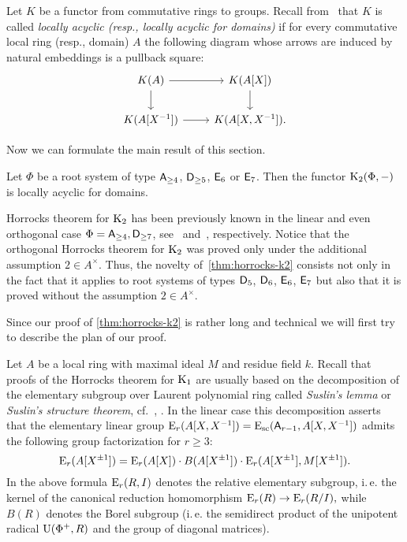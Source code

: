 \begin{dfn}
    Let $K$ be a functor from commutative rings to groups.
    Recall from~\cite{LSV2} that $K$ is called \textit{locally acyclic (resp., locally acyclic for domains)} if for every commutative local ring (resp., domain)
     $A$ the following diagram whose arrows are induced by natural embeddings is a pullback square:
    \begin{equation}\label{eq:P1-square} \begin{tikzcd} K(A) \ar[r] \ar[d] & K(A[X]) \arrow{d} \\ K(A[X\inv]) \ar{r} & K(A[X, X\inv]). \end{tikzcd} \end{equation}
\end{dfn}

Now we can formulate the main result of this section.
\begin{thm}\label{thm:horrocks-k2}
Let $\Phi$ be a root system of type $\mathsf{A}_{\geq 4}$, $\mathsf{D}_{\geq 5}$, $\mathsf{E}_6$ or $\mathsf{E}_7$.
Then the functor $\operatorname{K}_{2}(\Phi, -)$ is locally acyclic for domains.
\end{thm}
Horrocks theorem for $\operatorname{K}_2$ has been previously known in the linear and even orthogonal case $\Phi=\mathsf{A}_{\geq 4},\mathsf{D}_{\geq 7}$, see~\cite[Proposition~4.3]{Tu83} and~\cite[Theorem~1]{LS20}, respectively.
Notice that the orthogonal Horrocks theorem for $\operatorname{K}_2$ \cite[Theorem~1]{LS20} was proved only under the additional assumption $2 \in A^\times$.
Thus, the novelty of~\cref{thm:horrocks-k2} consists not only in the fact that it applies to root systems of types $\mathsf{D}_5$, $\mathsf{D}_6$, $\mathsf{E}_6$, $\mathsf{E}_7$ but also that
 it is proved without the assumption $2 \in A^\times$.

Since our proof of \cref{thm:horrocks-k2} is rather long and technical we will first try to describe the plan of our proof.

Let $A$ be a local ring with maximal ideal $M$ and residue field $k$.
Recall that proofs of the Horrocks theorem for $\operatorname{K}_1$ are usually based on the decomposition of the elementary subgroup over Laurent polynomial ring
 called \textit{Suslin's lemma} or \textit{Suslin's structure theorem}, cf.~\cite{Abe83, Su77}, \cite[\S~VI.6]{Lam10}.
In the linear case this decomposition asserts that the elementary linear group $\operatorname{E}_r(A[X, X^{-1}]) = \operatorname{E}_\mathrm{sc}(\mathsf{A}_{r-1}, A[X, X^{-1}])$ admits the following group factorization for $r \geq 3$:
\begin{equation}\label{eq:triple-decomposition}
\operatorname{E}_r(A[X^{\pm 1}]) = \operatorname{E}_r(A[X]) \cdot B(A[X^{\pm 1}]) \cdot \operatorname{E}_r(A[X^{\pm 1}], M[X^{\pm 1}]).
\end{equation}
In the above formula $\operatorname{E}_r(R, I)$ denotes the relative elementary subgroup, i.\,e. the kernel of the canonical reduction homomorphism $\operatorname{E}_r(R) \to \operatorname{E}_r(R/I),$
 while $B(R)$ denotes the Borel subgroup (i.\,e. the semidirect product of the unipotent radical $\operatorname{U}(\Phi^+, R)$ and the group of diagonal matrices).

